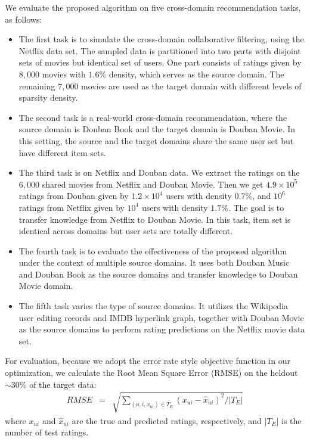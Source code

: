 We evaluate the proposed algorithm on five cross-domain recommendation tasks, as follows:
\begin{itemize}[noitemsep,topsep=0pt,parsep=0pt,partopsep=0pt]
\item The first task is to simulate the cross-domain collaborative filtering, using the Netflix data set. The sampled data is partitioned into two parts with disjoint sets of movies but identical set of users. One part consists of ratings given by $8,000$ movies with $1.6\%$ density, which serves as the source domain. The remaining $7,000$ movies are used as the target domain with different levels of sparsity density.
\item The second task is a real-world cross-domain recommendation, where the source domain is Douban Book and the target domain is Douban Movie. In this setting, the source and the target domains share the same user set but have different item sets.
\item The third task is on Netflix and Douban data. We extract the ratings on the $6,000$ shared movies from Netflix and Douban Movie. Then we get $4.9 \times 10^5$ ratings from Douban given by $1.2 \times 10^4$ users with density $0.7\%$, and $10^6$ ratings from Netflix given by $10^4$ users with density $1.7\%$. The goal is to transfer knowledge from Netflix to Douban Movie. In this task, item set is identical across domains but user sets are totally different.
\item The fourth task is to evaluate the effectiveness of the proposed algorithm under the context of multiple source domains. It uses both Douban Music and Douban Book as the source domains and transfer knowledge to Douban Movie domain.
\item The fifth task varies the type of source domains. It utilizes the Wikipedia user editing records and IMDB hyperlink graph, together with Douban Movie as the source domains to perform rating predictions on the Netflix movie data set.
\end{itemize}

For evaluation, because we adopt the error rate style objective function in our optimization, we calculate the Root Mean Square Error (RMSE) on the heldout $\sim 30\%$ of the target data:
\begin{eqnarray}
    RMSE &=& \sqrt{ \sum_{ (u, i, x_{ui}) \in T_E } (x_{ui} - \hat{x}_{ui})^2 / |T_E|} \nonumber
\end{eqnarray}
where $x_{ui}$ and $\hat{x}_{ui}$ are the true and predicted ratings, respectively, and $|T_E|$ is the number of test ratings.



